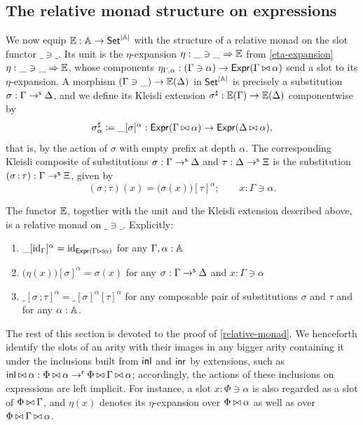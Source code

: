 \subsection{The relative monad structure on expressions}

We now equip $\mathbb{E} : \mathbb{A} \to \mathsf{Set}^{\left|\mathbb{A}\right|}$ with the structure of a relative monad on the slot functor $\_ \ni \_$. Its unit is the $\eta$-expansion $\eta : \_ \ni \_ \Rightarrow \mathbb{E}$ from \cref{eta-expansion} $\eta : \_ \ni \_ \Rightarrow \mathbb{E}$, whose components $\eta_{\Gamma, \alpha} : (\Gamma \ni \alpha) \to \mathsf{Expr}(\Gamma \mathbin{\bowtie} \alpha)$ send a slot to its $\eta$-expansion. A morphism $(\Gamma \ni \_) \to \mathbb{E}(\Delta)$ in $\mathsf{Set}^{\left|\mathbb{A}\right|}$ is precisely a substitution $\sigma : \Gamma \to^{\mathsf{s}} \Delta$, and we define its Kleisli extension $\sigma^\sharp : \mathbb{E}(\Gamma) \to \mathbb{E}(\Delta)$ componentwise by
\[
\sigma^\sharp_\alpha \coloneqq \_[\sigma]^\alpha : \mathsf{Expr}(\Gamma \mathbin{\bowtie} \alpha) \to \mathsf{Expr}(\Delta \mathbin{\bowtie} \alpha),
\]
that is, by the action of $\sigma$ with empty prefix at depth $\alpha$. The corresponding Kleisli composite of substitutions $\sigma : \Gamma \to^{\mathsf{s}} \Delta$ and $\tau : \Delta \to^{\mathsf{s}} \Xi$ is the substitution $(\sigma\,; \tau) : \Gamma \to^{\mathsf{s}} \Xi$, given by
\[
(\sigma\,; \tau)(x) = \big(\sigma(x)\big)[\tau]^\alpha; \qquad x : \Gamma \ni \alpha.
\]

\begin{theorem}\label{relative-monad}
    The functor $\mathbb{E}$, together with the unit and the Kleisli extension described above, is a relative monad on $\_ \ni \_$. Explicitly:
    \begin{enumerate}
        \item $\_[\mathrm{id}_\Gamma]^\alpha = \mathrm{id}_{\mathsf{Expr}(\Gamma \mathbin{\bowtie} \alpha)}$ for any $\Gamma, \alpha : \mathbb{A}$
        \item $\big(\eta(x)\big)[\sigma]^\alpha = \sigma(x)$ for any $\sigma : \Gamma \to^{\mathsf{s}} \Delta$ and $x : \Gamma \ni \alpha$
        \item $\_[\sigma \,; \tau]^\alpha = \_[\sigma]^\alpha[\tau]^\alpha$ for any composable pair of substitutions $\sigma$ and $\tau$ and  for any $\alpha : \mathbb{A}$.
    \end{enumerate}
\end{theorem}

The rest of this section is devoted to the proof of \cref{relative-monad}. We henceforth identify the slots of an arity with their images in any bigger arity containing it under the inclusions built from $\mathsf{inl}$ and $\mathsf{inr}$ by extensions, such as $\mathsf{inl} \mathbin{\bowtie} \alpha : \Phi \mathbin{\bowtie} \alpha \to^{\mathsf{r}} \Phi \mathbin{\bowtie} \Gamma \mathbin{\bowtie} \alpha$; accordingly, the actions of these inclusions on expressions are left implicit. For instance, a slot $x : \Phi \ni \alpha$ is also regarded as a slot of $\Phi \mathbin{\bowtie} \Gamma$, and $\eta(x)$ denotes its $\eta$-expansion over $\Phi \mathbin{\bowtie} \alpha$ as well as over $\Phi \mathbin{\bowtie} \Gamma \mathbin{\bowtie} \alpha$.

